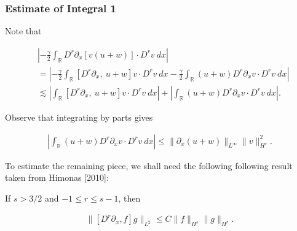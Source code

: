 \documentclass{beamer}
\numberwithin{equation}{section}
\newcommand{\rr}{\mathbb{R}}
\newcommand{\p}{\partial}
\begin{document}
\begin{frame}
\frametitle{Estimate of Integral 1} Note that


\begin{equation*}
\begin{split}
& \left |  -\frac{\gamma}{2} \int_{\rr} D^r \p_x [v(u+w)] \cdot
D^r v \ dx \right |
\\
& =
\left |
-\frac{\gamma}{2} \int_{\rr} \left[ D^r \p_x, \ u+w \right]v \cdot
D^r v \ dx - \frac{\gamma}{2} \int_{\rr} (u+w) D^r
\p_x v \cdot D^r v\ dx
\right | \\
& \lesssim \left |
\int_{\rr} \left[ D^r \p_x, \ u+w \right]v \cdot
D^r v \ dx \right |
+ \left | \int_{\rr} (u+w) D^r \p_x v
\cdot D^r v\
dx \right |.
\label{4v}
\end{split}
\end{equation*}

\pause

Observe that integrating by parts gives


\begin{equation*}
\begin{split}
\left | \int_{\rr} (u+w) D^r \p_x v \cdot
D^r v \ dx \right |
\le \|\p_x (u+w)\|_{L^\infty}
\|v\|_{H^r}^2.
\label{4'v}
\end{split}
\end{equation*}




\end{frame}

\begin{frame}
To estimate the remaining piece, we shall need the following
following result taken from Himonas [2010]:

    \begin{lemma}
\label{cor1}
If $s > 3/2$ and $-1 \le r  \le s -1$, then


\begin{equation*}
\begin{split}
\|[D^r \p_x ,f]g\|_{L^2} \le C \|f\|_{H^s} \|g\|_{H^r}.
\label{15}
\end{split}
\end{equation*}


\end{lemma}
\end{frame}
\end{document}
